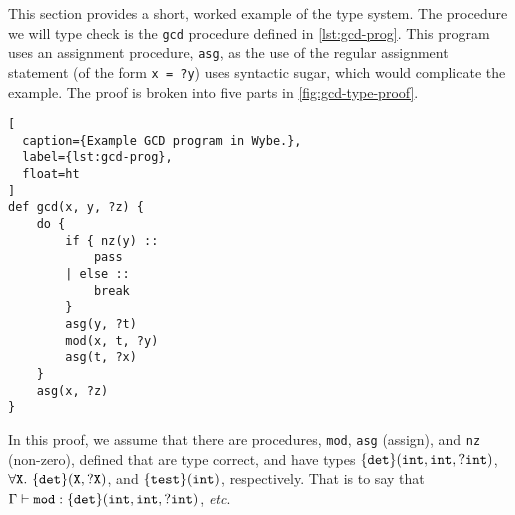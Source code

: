 This section provides a short, worked example of the type system. The procedure we will type check is the \texttt{gcd} procedure defined in \cref{lst:gcd-prog}. This program uses an assignment procedure, \texttt{asg}, as the use of the regular assignment statement (of the form \texttt{x = ?y}) uses syntactic sugar, which would complicate the example. The proof is broken into five parts in \cref{fig:gcd-type-proof}.

\begin{lstlisting}[
  caption={Example GCD program in Wybe.},
  label={lst:gcd-prog},
  float=ht
]
def gcd(x, y, ?z) {
    do {
        if { nz(y) ::
            pass
        | else ::
            break
        }
        asg(y, ?t)
        mod(x, t, ?y)
        asg(t, ?x)
    }
    asg(x, ?z)
}
\end{lstlisting}

In this proof, we assume that there are procedures, \texttt{mod}, \texttt{asg} (assign), and \texttt{nz} (non-zero), defined that are type correct, and have types $\lbrace\texttt{det}\rbrace(\mathtt{int}, \mathtt{int}, \mathtt{?int})$, $\forall \mathtt{X}.\ \set{\texttt{det}}(\mathtt{X}, \mathtt{?X})$, and $\lbrace\texttt{test}\rbrace(\mathtt{int})$, respectively. That is to say that $\Gamma \vdash \mathtt{mod}:\lbrace\texttt{det}\rbrace(\mathtt{int}, \mathtt{int}, \mathtt{?int})$, \textit{etc}.

